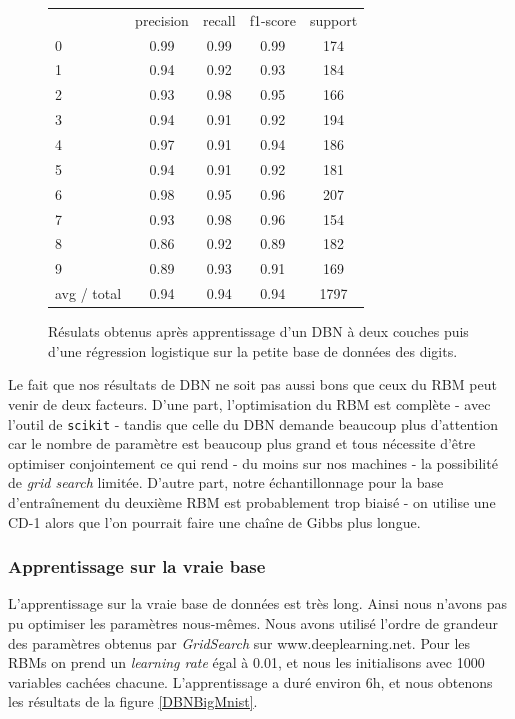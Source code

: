 \documentclass[10pt,a4paper]{article}
\begin{document}
\begin{figure}[ht!]
\centering
	\begin{tabular}{l|c|c|c|c}
	& precision   & recall  &f1-score &  support \\
          0&       0.99&      0.99&      0.99    &   174 \\
          1 &      0.94 &     0.92 &     0.93    &   184\\
          2  &     0.93  &    0.98  &    0.95       &166\\
          3   &    0.94   &   0.91   &   0.92       &194\\
          4    &   0.97    &  0.91    &  0.94      & 186\\
          5     &  0.94     & 0.91     & 0.92     &  181\\
          6      & 0.98      &0.95      &0.96    &   207\\
          7       &0.93&      0.98&      0.96   &    154\\
          8&       0.86 &     0.92 &     0.89  &     182\\
          9 &      0.89  &    0.93  &    0.91 &      169\\
avg / total  &     0.94   &   0.94   &   0.94&      1797\\
	\end{tabular}
	\label{DBNDigits}
	\caption{Résulats obtenus après apprentissage d'un DBN à deux couches puis d'une régression logistique sur la petite base de données des digits.}
\end{figure}

Le fait que nos résultats de DBN ne soit pas aussi bons que ceux du RBM peut venir de deux facteurs. D'une part, l'optimisation du RBM est complète - avec l'outil de \texttt{scikit} - tandis que celle du DBN demande beaucoup plus d'attention car le nombre de paramètre est beaucoup plus grand et tous nécessite d'être optimiser conjointement ce qui rend - du moins sur nos machines - la possibilité de \emph{grid search} limitée. D'autre part, notre échantillonnage pour la base d'entraînement du deuxième RBM est probablement trop biaisé - on utilise une CD-1 alors que l'on pourrait faire une chaîne de Gibbs plus longue. 


\subsubsection{Apprentissage sur la vraie base}


L'apprentissage sur la vraie base de données est très long. Ainsi nous n'avons pas pu optimiser les paramètres nous-mêmes. Nous avons utilisé l'ordre de grandeur des paramètres obtenus par \textit{GridSearch} sur www.deeplearning.net. Pour les RBMs on prend un \emph{learning rate} égal à 0.01, et nous les initialisons avec 1000 variables cachées chacune. L'apprentissage a duré environ 6h, et nous obtenons les résultats de la figure \ref{DBNBigMnist}.
\end{document}
